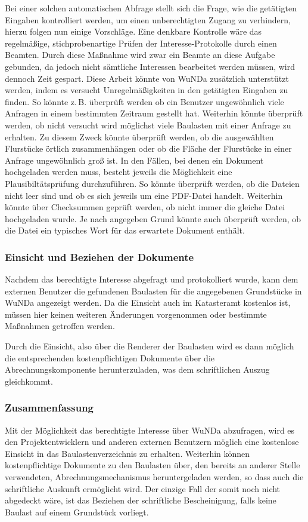 Bei einer solchen automatischen Abfrage stellt sich die Frage, wie die getätigten Eingaben kontrolliert werden, um einen unberechtigten Zugang zu verhindern, hierzu folgen nun einige Vorschläge.
Eine denkbare Kontrolle wäre das regelmäßige, stichprobenartige Prüfen der Interesse-Protokolle durch einen Beamten.
Durch diese Maßnahme wird zwar ein Beamte an diese Aufgabe gebunden, da jedoch nicht sämtliche Interessen bearbeitet werden müssen, wird dennoch Zeit gespart.
Diese Arbeit könnte von \ac{WuNDa} zusätzlich unterstützt werden, indem es versucht Unregelmäßigkeiten in den getätigten Eingaben zu finden.
So könnte z.\,B. überprüft werden ob ein Benutzer ungewöhnlich viele Anfragen in einem bestimmten Zeitraum gestellt hat.
Weiterhin könnte überprüft werden, ob nicht versucht wird möglichst viele Baulasten mit einer Anfrage zu erhalten.
Zu diesem Zweck könnte überprüft werden, ob die ausgewählten Flurstücke örtlich zusammenhängen oder ob die Fläche der Flurstücke in einer Anfrage ungewöhnlich groß ist.
In den Fällen, bei denen ein Dokument hochgeladen werden muss, besteht jeweils die Möglichkeit eine Plausibiltätsprüfung durchzuführen.
So könnte überprüft werden, ob die Dateien nicht leer sind und ob es sich jeweils um eine PDF-Datei handelt.
Weiterhin könnte über Checksummen geprüft werden, ob nicht immer die gleiche Datei hochgeladen wurde.
Je nach angegeben Grund könnte auch überprüft werden, ob die Datei ein typisches Wort für das erwartete Dokument enthält.

\subsubsection{Einsicht und Beziehen der Dokumente}
Nachdem das berechtigte Interesse abgefragt und protokolliert wurde, kann dem externen Benutzer die gefundenen Baulasten für die angegebenen Grundstücke in \ac{WuNDa} angezeigt werden.
Da die Einsicht auch im Katasteramt kostenlos ist, müssen hier keinen weiteren Änderungen vorgenommen oder bestimmte Maßnahmen getroffen werden.

Durch die Einsicht, also über die Renderer der Baulasten wird es dann möglich die entsprechenden kostenpflichtigen Dokumente über die Abrechnungskomponente herunterzuladen, was dem schriftlichen Auszug gleichkommt.

\subsubsection{Zusammenfassung}
Mit der Möglichkeit das berechtigte Interesse über \ac{WuNDa} abzufragen, wird es den Projektentwicklern und anderen externen Benutzern möglich eine kostenlose Einsicht in das Baulastenverzeichnis zu erhalten.
Weiterhin können kostenpflichtige Dokumente zu den Baulasten über, den bereits an anderer Stelle verwendeten, Abrechnungsmechanismus heruntergeladen werden, so dass auch die schriftliche Auskunft ermöglicht wird.
Der einzige Fall der somit noch nicht abgedeckt wäre, ist das Beziehen der schriftliche Bescheinigung, falls keine Baulast auf einem Grundstück vorliegt.

